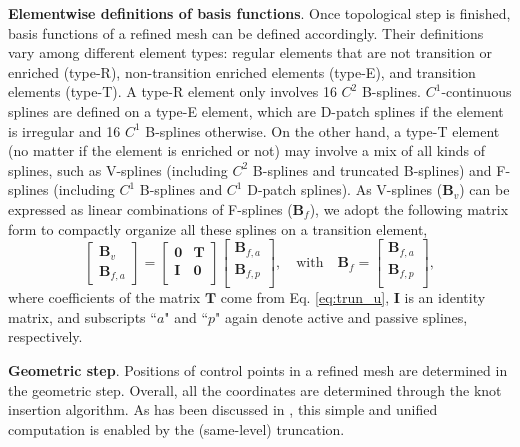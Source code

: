 \documentclass[graybox]{svmult}
\begin{document}
\vspace{+2mm}\noindent\textbf{Elementwise definitions of basis functions}.
Once topological step is finished, basis functions of a refined mesh can be defined accordingly. Their definitions vary among different element types: regular elements that are not transition or enriched (type-R), non-transition enriched elements (type-E), and transition elements (type-T). A type-R element only involves 16 $C^2$ B-splines. $C^1$-continuous splines are defined on a type-E element, which are D-patch splines if the element is irregular and 16 $C^1$ B-splines otherwise. On the other hand, a type-T element (no matter if the element is enriched or not) may involve a mix of all kinds of splines, such as V-splines (including $C^2$ B-splines and truncated B-splines) and F-splines (including $C^1$ B-splines and $C^1$ D-patch splines). As V-splines ($\bm{B}_v$) can be expressed as linear combinations of F-splines ($\bm{B}_f$), we adopt the following matrix form to compactly organize all these splines on a transition element,
\begin{equation}
\begin{bmatrix}
\bm{B}_v \\ \bm{B}_{f\!,a}
\end{bmatrix} =
\begin{bmatrix}
\bm{0} & \bm{T} \\
\bm{I} & \bm{0} \\
\end{bmatrix}
\begin{bmatrix}
\bm{B}_{f\!,a} \\ \bm{B}_{f\!,p} \\
\end{bmatrix} , \quad \text{with} \quad
\bm{B}_f = 
\begin{bmatrix}
\bm{B}_{f\!,a} \\ \bm{B}_{f\!,p} \\
\end{bmatrix},
\label{eq:trun_trans}
\end{equation}
where coefficients of the matrix $\bm{T}$ come from Eq. \eqref{eq:trun_u}, $\bm{I}$ is an identity matrix, and subscripts ``$a$" and ``$p$" again denote active and passive splines, respectively. 

\vspace{+2mm}\noindent\textbf{Geometric step}.
Positions of control points in a refined mesh are determined in the geometric step. Overall, all the coordinates are determined through the knot insertion algorithm. As has been discussed in \cite{ref:wei18}, this simple and unified computation is enabled by the (same-level) truncation. 
\end{document}
